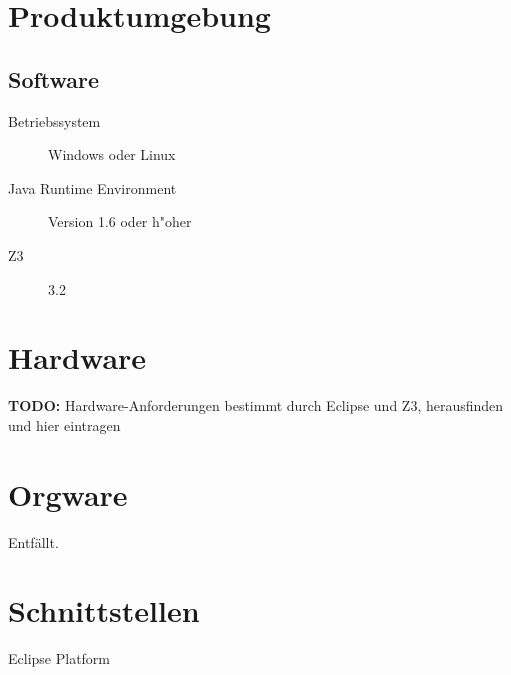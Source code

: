 \section{Produktumgebung}%

\subsection{Software}%

\begin{description}%
    \item [Betriebssystem] \see Windows oder \see Linux%
    \item [\see Java Runtime Environment] Version 1.6 oder h"oher%
    \item [\see Z3] 3.2%
\end{description}%

\section{Hardware}%

\textbf{TODO:} Hardware-Anforderungen bestimmt durch Eclipse und Z3, herausfinden und hier eintragen%

\section{\see Orgware}%

Entfällt.%

\section{Schnittstellen}%

\begin{description}%
    \item [\see Eclipse Platform]%
\end{description}%
